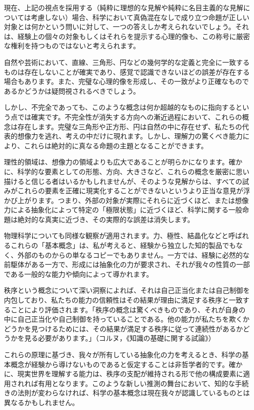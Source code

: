 \documentclass[a4paper,11pt,openany]{ltjsbook}
\begin{document}
現在、上記の視点を採用する（純粋に理想的な見解や純粋に名目主義的な見解については考慮しない）場合、科学において真偽混在なしで成り立つ命題が正しい対象とは何かという問いに対して、一つの答えしか考えられないでしょう。それは、経験上の個々の対象もしくはそれらを提示する心理的像も、この称号に厳密な権利を持つものではないと考えられます。

自然や芸術において、直線、三角形、円などの幾何学的な定義と完全に一致するものは存在しないことが確実であり、感覚で認識できないほどの誤差が存在する場合もあります。また、完璧な心理的像を形成し、その一致がより正確なものであるかどうかは疑問視されるべきでしょう。

しかし、不完全であっても、このような概念は何か超越的なものに指向するという点では確実です。不完全性が消失する方向への漸近過程において、これらの概念は存在します。完璧な三角形や正方形、円は自然の中に存在せず、私たちの代表的想像力を逃れ、考えの中だけに現れます。しかし、理解力の驚くべき能力により、これらは絶対的に真なる命題の主題となることができます。

理性的領域は、想像力の領域よりも広大であることが明らかになります。確かに、科学的な要素としての形態、方向、大きさなど、これらの概念を厳密に思い描けると信じる者はいるかもしれませんが、そのような見解からは、すべての試みがこれらの要素を正確に現実化することができないというより正当な意見が浮かび上がります。つまり、外部の対象が実際にそれらに近づくほど、または想像力による抽象化によって特定の「極限状態」に近づくほど、科学に関する一般命題は絶対的な真実に近づき、その実際的な誤差は消失します。

物理科学についても同様な観察が適用されます。力、極性、結晶化などと呼ばれるこれらの「基本概念」は、私が考えると、経験から独立した知的製品でもなく、外部のものからの単なるコピーでもありません。一方では、経験に必然的な前駆体がある一方で、形成には抽象化の力が要求され、それが我々の性質の一部である一般的な能力や傾向によって導かれます。

秩序という概念について深い洞察によれば、それは自己正当化または自己制御を内包しており、私たちの能力の信頼性はその結果が理由に満足する秩序と一致することにより評価されます。「秩序の概念は驚くべきものであり、それが自身の中に自己正当化や自己制御を持っていることである。他の能力が私たちを欺くかどうかを見つけるためには、その結果が満足する秩序に従って連続性があるかどうかを見る必要があります。」（コルヌ，《知識の基礎に関する試論》）

これらの原理に基づき、我々が所有している抽象化の力を考えるとき、科学の基本概念が経験から導けないものであると仮定することは非哲学者的です。確かに、現実世界を理解する能力は、秩序の支配が維持される形で他の構成要素に適用されれば有用となります。このような新しい推測の舞台において、知的な手続きの法則が変わらなければ、科学の基本概念は現在我々が認識しているものとは異なるかもしれません。
\end{document}
